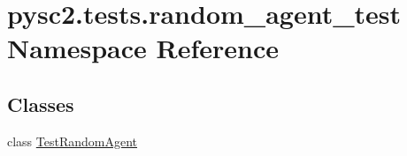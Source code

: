 \hypertarget{namespacepysc2_1_1tests_1_1random__agent__test}{}\section{pysc2.\+tests.\+random\+\_\+agent\+\_\+test Namespace Reference}
\label{namespacepysc2_1_1tests_1_1random__agent__test}
\subsection*{Classes}
\begin{DoxyCompactItemize}
\item 
class \mbox{\hyperlink{classpysc2_1_1tests_1_1random__agent__test_1_1_test_random_agent}{Test\+Random\+Agent}}
\end{DoxyCompactItemize}
